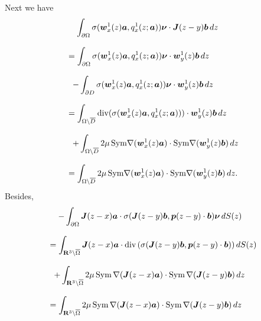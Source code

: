 Next we have
$$\begin{array}{l}
\displaystyle
\,\,\,\,\,\,
\int_{\partial\Omega}\sigma(\mbox{\boldmath $w$}_x^1(z)\mbox{\boldmath $a$},q_x^1(z;\mbox{\boldmath $a$}))\mbox{\boldmath $\nu$}\cdot
\mbox{\boldmath $J$}(z-y)\mbox{\boldmath $b$}\,dz\\
\\
\displaystyle
=\int_{\partial\Omega}\sigma(\mbox{\boldmath $w$}_x^1(z)\mbox{\boldmath $a$},q_x^1(z;\mbox{\boldmath $a$}))\mbox{\boldmath $\nu$}
\cdot
\mbox{\boldmath $w$}_y^1(z)\mbox{\boldmath $b$}\,dz
\\
\\
\displaystyle
\,\,\,
-\int_{\partial D}\sigma(\mbox{\boldmath $w$}_x^1(z)\mbox{\boldmath $a$},q_x^1(z;\mbox{\boldmath $a$}))\mbox{\boldmath $\nu$}
\cdot
\mbox{\boldmath $w$}_y^1(z)\mbox{\boldmath $b$}\,dz
\\
\\
\displaystyle
=\int_{\Omega\setminus\overline{D}}\text{div}(\sigma(\mbox{\boldmath $w$}_x^1(z)\mbox{\boldmath $a$},q_x^1(z;\mbox{\boldmath $a$})))
\cdot
\mbox{\boldmath $w$}_y^1(z)\mbox{\boldmath $b$}\,dz
\\
\\
\displaystyle
\,\,\,
+\int_{\Omega\setminus\overline{D}}2\mu\,\text{Sym}\nabla(\mbox{\boldmath $w$}_x^1(z)\mbox{\boldmath $a$})
\cdot\text{Sym}\nabla(\mbox{\boldmath $w$}_y^1(z)\mbox{\boldmath $b$})\,dz
\\
\\
\displaystyle
=\int_{\Omega\setminus\overline{D}}2\mu\,\text{Sym}\nabla(\mbox{\boldmath $w$}_x^1(z)\mbox{\boldmath $a$})
\cdot\text{Sym}\nabla(\mbox{\boldmath $w$}_y^1(z)\mbox{\boldmath $b$})\,dz.
\end{array}
$$
Besides,
$$\begin{array}{l}
\displaystyle
\,\,\,\,\,\,
-\int_{\partial\Omega}\mbox{\boldmath $J$}(z-x)\mbox{\boldmath $a$}\cdot
\sigma(\mbox{\boldmath $J$}(z-y)\mbox{\boldmath $b$},
\mbox{\boldmath $p$}(z-y)\cdot\mbox{\boldmath $b$})\mbox{\boldmath $\nu$}\,dS(z)
\\
\\
\displaystyle
=\int_{\Bbb R^3\setminus\overline{\Omega}}
\mbox{\boldmath $J$}(z-x)\mbox{\boldmath $a$}\cdot
\text{div}\,(\sigma(\mbox{\boldmath $J$}(z-y)\mbox{\boldmath $b$},
\mbox{\boldmath $p$}(z-y)\cdot\mbox{\boldmath $b$}))\,dS(z)\\
\\
\displaystyle
\,\,\,
+\int_{\Bbb R^3\setminus\overline{\Omega}}
2\mu\,\text{Sym}\,\nabla(\mbox{\boldmath $J$}(z-x)\mbox{\boldmath $a$})
\cdot\text{Sym}\,\nabla(\mbox{\boldmath $J$}(z-y)\mbox{\boldmath $b$})
\,dz
\\
\\
\displaystyle
=\int_{\Bbb R^3\setminus\overline{\Omega}}
2\mu\,\text{Sym}\,\nabla(\mbox{\boldmath $J$}(z-x)\mbox{\boldmath $a$})
\cdot\text{Sym}\,\nabla(\mbox{\boldmath $J$}(z-y)\mbox{\boldmath $b$})\,dz
\end{array}
$$
